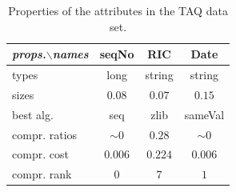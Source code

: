 \begin{table}[t]
\centering
\begin{tabular}{|l||c|c|c|}\hline 
\emph{props.}$\backslash$\emph{names} 
              & seqNo    & RIC     & Date         \\\hline
types         & long     & string  & string       \\\hline
sizes         & $0.08$   & $0.07$  & $0.15$       \\\hline
best alg.     & seq      & zlib    & sameVal      \\\hline
compr. ratios & $\sim 0$ & $0.28$  & $\sim 0$     \\\hline
compr. cost   & $0.006$  & $0.224$ & $0.006$      \\\hline
compr. rank   & $0$      & $7$     & $1$          \\\hline
\end{tabular}
\caption{Properties of the attributes in the TAQ data set.}\label{tbl:data}
\end{table}            

